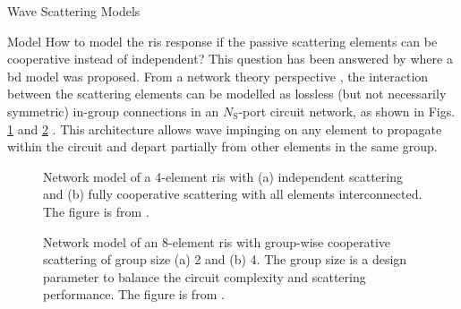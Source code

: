 \begin{section}{}
\begin{subsection}{Wave Scattering Models}
		\begin{subsection}{ Model}
			How to model the \gls{ris} response if the passive scattering elements can be cooperative instead of independent?
			This question has been answered by \cite{Shen2020a} where a \gls{bd} model was proposed.
			From a network theory perspective \cite{Ivrlac2010}, the interaction between the scattering elements can be modelled as lossless (but not necessarily symmetric) in-group connections in an $N_\mathrm{S}$-port circuit network, as shown in Figs. \ref{fg:bd_ris_architecture_1} and \ref{fg:bd_ris_architecture_2} \cite{Shen2020a}.
			This architecture allows wave impinging on any element to propagate within the circuit and depart partially from other elements in the same group.
			\begin{figure}[H]
				\centering
				\caption{Network model of a 4-element \gls{ris} with (a) independent scattering and (b) fully cooperative scattering with all elements interconnected. The figure is from \cite{Shen2020a}.}
				\label{fg:bd_ris_architecture_1}
			\end{figure}
			\begin{figure}[H]
				\centering
				\caption{Network model of an 8-element \gls{ris} with group-wise cooperative scattering of group size (a) 2 and (b) 4. The group size is a design parameter to balance the circuit complexity and scattering performance. The figure is from \cite{Shen2020a}.}
				\label{fg:bd_ris_architecture_2}
			\end{figure}


\end{subsection}
\end{subsection}
\end{section}
